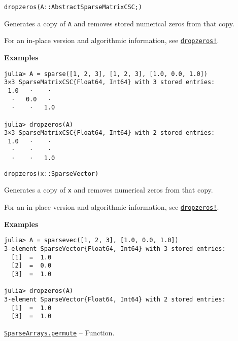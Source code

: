\begin{adjustwidth}{2em}{0pt}


\begin{verbatim}
dropzeros(A::AbstractSparseMatrixCSC;)
\end{verbatim}

Generates a copy of \texttt{A} and removes stored numerical zeros from that copy.

For an in-place version and algorithmic information, see \hyperlink{13132808383029320263}{\texttt{dropzeros!}}.

\textbf{Examples}


\begin{verbatim}
julia> A = sparse([1, 2, 3], [1, 2, 3], [1.0, 0.0, 1.0])
3×3 SparseMatrixCSC{Float64, Int64} with 3 stored entries:
 1.0   ⋅    ⋅
  ⋅   0.0   ⋅
  ⋅    ⋅   1.0

julia> dropzeros(A)
3×3 SparseMatrixCSC{Float64, Int64} with 2 stored entries:
 1.0   ⋅    ⋅
  ⋅    ⋅    ⋅
  ⋅    ⋅   1.0
\end{verbatim}




\begin{lstlisting}
dropzeros(x::SparseVector)
\end{lstlisting}

Generates a copy of \texttt{x} and removes numerical zeros from that copy.

For an in-place version and algorithmic information, see \hyperlink{13132808383029320263}{\texttt{dropzeros!}}.

\textbf{Examples}


\begin{verbatim}
julia> A = sparsevec([1, 2, 3], [1.0, 0.0, 1.0])
3-element SparseVector{Float64, Int64} with 3 stored entries:
  [1]  =  1.0
  [2]  =  0.0
  [3]  =  1.0

julia> dropzeros(A)
3-element SparseVector{Float64, Int64} with 2 stored entries:
  [1]  =  1.0
  [3]  =  1.0
\end{verbatim}



\end{adjustwidth}
\hypertarget{12003442917636022234}{}
\hyperlink{12003442917636022234}{\texttt{SparseArrays.permute}}  -- {Function.}

